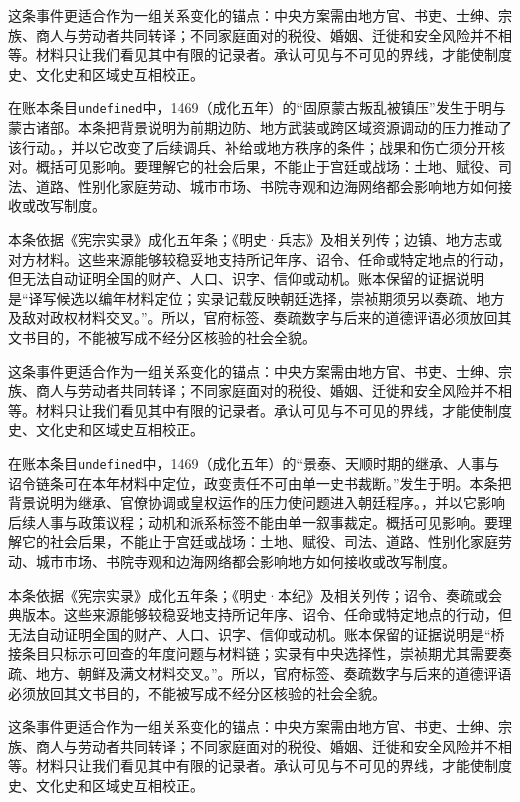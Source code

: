 这条事件更适合作为一组关系变化的锚点：中央方案需由地方官、书吏、士绅、宗族、商人与劳动者共同转译；不同家庭面对的税役、婚姻、迁徙和安全风险并不相等。材料只让我们看见其中有限的记录者。承认可见与不可见的界线，才能使制度史、文化史和区域史互相校正。

在账本条目\texttt{undefined}中，1469（成化五年）的“固原蒙古叛乱被镇压”发生于明与蒙古诸部。本条把背景说明为前期边防、地方武装或跨区域资源调动的压力推动了该行动。，并以它改变了后续调兵、补给或地方秩序的条件；战果和伤亡须分开核对。概括可见影响。要理解它的社会后果，不能止于宫廷或战场：土地、赋役、司法、道路、性别化家庭劳动、城市市场、书院寺观和边海网络都会影响地方如何接收或改写制度。

本条依据《宪宗实录》成化五年条；《明史·兵志》及相关列传；边镇、地方志或对方材料。这些来源能够较稳妥地支持所记年序、诏令、任命或特定地点的行动，但无法自动证明全国的财产、人口、识字、信仰或动机。账本保留的证据说明是“译写候选以编年材料定位；实录记载反映朝廷选择，崇祯期须另以奏疏、地方及敌对政权材料交叉。”。所以，官府标签、奏疏数字与后来的道德评语必须放回其文书目的，不能被写成不经分区核验的社会全貌。

这条事件更适合作为一组关系变化的锚点：中央方案需由地方官、书吏、士绅、宗族、商人与劳动者共同转译；不同家庭面对的税役、婚姻、迁徙和安全风险并不相等。材料只让我们看见其中有限的记录者。承认可见与不可见的界线，才能使制度史、文化史和区域史互相校正。

在账本条目\texttt{undefined}中，1469（成化五年）的“景泰、天顺时期的继承、人事与诏令链条可在本年材料中定位，政变责任不可由单一史书裁断。”发生于明。本条把背景说明为继承、官僚协调或皇权运作的压力使问题进入朝廷程序。，并以它影响后续人事与政策议程；动机和派系标签不能由单一叙事裁定。概括可见影响。要理解它的社会后果，不能止于宫廷或战场：土地、赋役、司法、道路、性别化家庭劳动、城市市场、书院寺观和边海网络都会影响地方如何接收或改写制度。

本条依据《宪宗实录》成化五年条；《明史·本纪》及相关列传；诏令、奏疏或会典版本。这些来源能够较稳妥地支持所记年序、诏令、任命或特定地点的行动，但无法自动证明全国的财产、人口、识字、信仰或动机。账本保留的证据说明是“桥接条目只标示可回查的年度问题与材料链；实录有中央选择性，崇祯期尤其需要奏疏、地方、朝鲜及满文材料交叉。”。所以，官府标签、奏疏数字与后来的道德评语必须放回其文书目的，不能被写成不经分区核验的社会全貌。

这条事件更适合作为一组关系变化的锚点：中央方案需由地方官、书吏、士绅、宗族、商人与劳动者共同转译；不同家庭面对的税役、婚姻、迁徙和安全风险并不相等。材料只让我们看见其中有限的记录者。承认可见与不可见的界线，才能使制度史、文化史和区域史互相校正。

